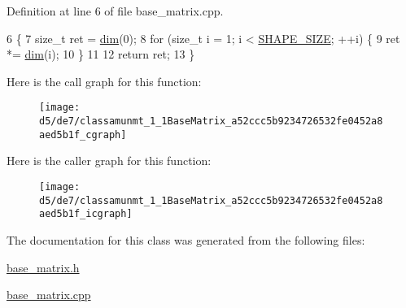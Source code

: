 Definition at line 6 of file base\+\_\+matrix.\+cpp.


\begin{DoxyCode}
6                               \{
7   \textcolor{keywordtype}{size\_t} ret = \hyperlink{classamunmt_1_1BaseMatrix_a8fca680b1a864b3d99e9cfe6aa60f1d4}{dim}(0);
8   \textcolor{keywordflow}{for} (\textcolor{keywordtype}{size\_t} i = 1; i < \hyperlink{namespaceamunmt_a0c4d3d7c0b1b52dbe7a658b3dc026409}{SHAPE\_SIZE}; ++i) \{
9     ret *= \hyperlink{classamunmt_1_1BaseMatrix_a8fca680b1a864b3d99e9cfe6aa60f1d4}{dim}(i);
10   \}
11 
12   \textcolor{keywordflow}{return} ret;
13 \}
\end{DoxyCode}


Here is the call graph for this function\+:
\nopagebreak
\begin{figure}[H]
\begin{center}
\leavevmode
\texttt{[image: d5/de7/classamunmt\_1\_1BaseMatrix\_a52ccc5b9234726532fe0452a8aed5b1f\_cgraph]}
\end{center}
\end{figure}




Here is the caller graph for this function\+:
\nopagebreak
\begin{figure}[H]
\begin{center}
\leavevmode
\texttt{[image: d5/de7/classamunmt\_1\_1BaseMatrix\_a52ccc5b9234726532fe0452a8aed5b1f\_icgraph]}
\end{center}
\end{figure}




The documentation for this class was generated from the following files\+:\begin{DoxyCompactItemize}
\item 
\hyperlink{base__matrix_8h}{base\+\_\+matrix.\+h}\item 
\hyperlink{base__matrix_8cpp}{base\+\_\+matrix.\+cpp}\end{DoxyCompactItemize}
